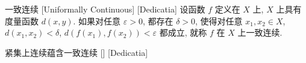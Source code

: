\documentclass[UTF8]{ctexart}
\newcommand{\hyperrefc}[2]{\hyperref[#1]{\textcolor{purple}{#2}}}
\begin{document}





        \begin{dfn}
            [UUID]
            {一致连续}
            [Uniformally Continuous]
            [Dedicatia]
            设函数 \(f\) 定义在 \(X\) 上,  \(X\) 上具有度量函数 \(d(x,y)\). 如果对任意 \(\varepsilon>0\), 都存在 \(\delta>0\), 使得对任意 \(x_1,x_2\in X\),  \(d(x_1,x_2)<\delta\),  \(d(f(x_1),f(x_2))<\varepsilon\) 都成立, 就称 \(f\) 在 \(X\) 上一致连续. 
        \end{dfn}

        \begin{thm}
            [UUID]
            {紧集上连续蕴含一致连续}
            []
            [Dedicatia]
        \end{thm}

\end{document}
